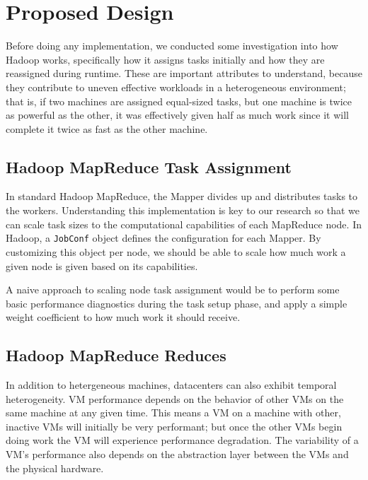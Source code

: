 \section{Proposed Design}
\label{section:propeseddesign}

Before doing any implementation, we conducted some investigation into how Hadoop works, 
specifically how it assigns tasks initially and how they are reassigned during runtime.
These are important attributes to understand, because they contribute to uneven effective
workloads in a heterogeneous environment; that is, if two machines are assigned equal-sized
tasks, but one machine is twice as powerful as the other, it was effectively given half as
much work since it will complete it twice as fast as the other machine.

\subsection{Hadoop MapReduce Task Assignment}
In standard Hadoop MapReduce, the Mapper divides up and distributes tasks to the workers.
Understanding this implementation is key to our research so that we can scale task sizes
to the computational capabilities of each MapReduce node. In Hadoop, a \texttt{JobConf}
object defines the configuration for each Mapper. By customizing this object per node,
we should be able to scale how much work a given node is given based on its capabilities.

A naive approach to scaling node task assignment would be to perform some basic performance
diagnostics during the task setup phase, and apply a simple weight coefficient to how much
work it should receive.

\subsection{Hadoop MapReduce Reduces}
In addition to hetergeneous machines, datacenters can also exhibit temporal heterogeneity.
VM performance depends on the behavior of other VMs on the same machine at any given time.
This means a VM on a machine with other, inactive VMs will initially be very performant;
but once the other VMs begin doing work the VM will experience performance degradation.
The variability of a VM's performance also depends on the abstraction layer between the VMs
and the physical hardware.

